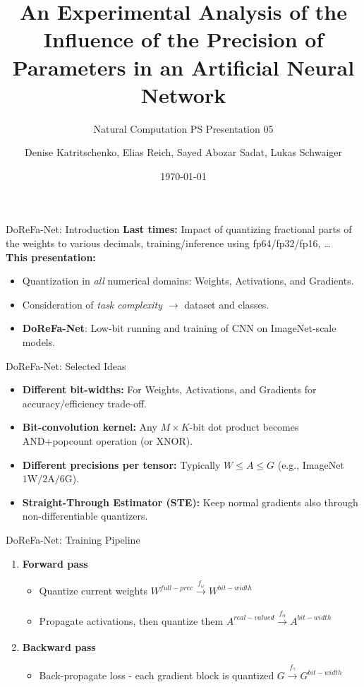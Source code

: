 \documentclass[aspectratio=169]{beamer} %
\title{An Experimental Analysis of the Influence of the Precision of Parameters in an Artificial Neural Network}
\subtitle{Natural Computation PS Presentation 05}
\author[D. K., E. R., S. A. S., L. S.]{Denise Katritschenko, Elias Reich, Sayed Abozar Sadat, Lukas Schwaiger}
\institute[\plusshort]{\pluslong\\ Department of Artificial Intelligence and Human Interfaces (AIHI)}
\date[\today]{\today}
\begin{document}
\frame{\titlepage}

\begin{frame}{DoReFa-Net: Introduction}
  \textbf{Last times:} Impact of quantizing fractional parts of the weights to various decimals, training/inference using fp64/fp32/fp16, \dots\\
  \vspace{0.5cm}
  \textbf{This presentation:}
  \begin{itemize}
    \item Quantization in \textit{all} numerical domains: Weights, Activations, and Gradients.
    \item Consideration of \textit{task complexity} $\rightarrow$ dataset and classes.
    \item \textbf{DoReFa-Net}\cite{zhou2016dorefa}: Low-bit running and training of CNN on ImageNet-scale models.
  \end{itemize}
\end{frame}

\begin{frame}{DoReFa-Net: Selected Ideas}
  \begin{itemize}
    \item \textbf{Different bit-widths:} For Weights, Activations, and Gradients for accuracy/efficiency trade-off.
    \item \textbf{Bit-convolution kernel:} Any $M\times K$-bit dot product becomes AND+popcount operation (or XNOR).
    \item \textbf{Different precisions per tensor:} Typically $W\le A \le G$ (e.g., ImageNet $1\text{W}/2\text{A}/6\text{G}$).
    \item \textbf{Straight-Through Estimator (STE):} Keep normal gradients also through non-differentiable quantizers.
  \end{itemize}
\end{frame}

\begin{frame}{DoReFa-Net: Training Pipeline}
  \begin{enumerate}
    \item \textbf{Forward pass}
          \begin{itemize}
            \item Quantize current weights $W^{full-prec}\xrightarrow[]{f_\omega}W^{bit-width}$
            \item Propagate activations, then quantize them $A^{real-valued}\xrightarrow[]{f_\alpha}A^{bit-width}$
          \end{itemize}
    \item \textbf{Backward pass}
          \begin{itemize}
            \item Back-propagate loss - each gradient block is quantized $G\xrightarrow[]{f_\gamma}G^{bit-width}$
          \end{itemize}
  \end{enumerate}
\end{frame}
\end{document}
